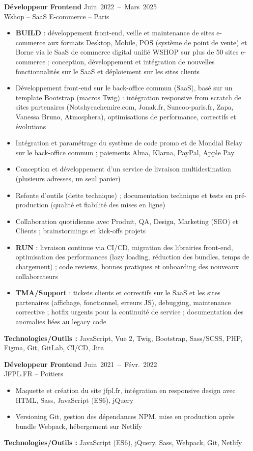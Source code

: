 \documentclass[9pt,a4paper]{extarticle}
\newcommand{\entry}[3]{%
  \vspace{0.25em}%
  {\bfseries #1} \hfill {\color{grey}\footnotesize\mbox{#2}}\\[-1pt]
  {\color{accent}\footnotesize #3}\par\vspace{0.1em}%
}
\begin{document}
{\begin{minipage}[t]{0.488\textwidth}
\entry{Développeur Frontend}{Juin 2022 -- Mars 2025}{Wshop -- SaaS E-commerce -- Paris}
\begin{itemize}
  \item \textbf{BUILD} : développement front-end, veille et maintenance de sites e-commerce aux formats Desktop, Mobile, POS (système de point de vente) et Borne via le SaaS de commerce digital unifié WSHOP sur plus de 50 sites e-commerce ; conception, développement et intégration de nouvelles fonctionnalités sur le SaaS et déploiement sur les sites clients
  \item Développement front-end sur le back-office commun (SaaS), basé sur un template Bootstrap (macros Twig) : intégration responsive from scratch de sites partenaires (Notshycachemire.com, Jonak.fr, Suncoo-paris.fr, Zapa, Vanessa Bruno, Atmosphera), optimisations de performance, correctifs et évolutions
  \item Intégration et paramétrage du système de code promo et de Mondial Relay sur le back-office commun ; paiements Alma, Klarna, PayPal, Apple Pay
  \item Conception et développement d'un service de livraison multidestination (plusieurs adresses, un seul panier)
  \item Refonte d'outils (dette technique) ; documentation technique et tests en pré-production (qualité et fiabilité des mises en ligne)
  \item Collaboration quotidienne avec Produit, QA, Design, Marketing (SEO) et Clients ; brainstormings et kick-offs projets
  \item \textbf{RUN} : livraison continue via CI/CD, migration des librairies front-end, optimisation des performances (lazy loading, réduction des bundles, temps de chargement) ; code reviews, bonnes pratiques et onboarding des nouveaux collaborateurs
  \item \textbf{TMA/Support} : tickets clients et correctifs sur le SaaS et les sites partenaires (affichage, fonctionnel, erreurs JS), debugging, maintenance corrective ; hotfix urgents pour la continuité de service ; documentation des anomalies liées au legacy code
\end{itemize}
{\footnotesize\textbf{Technologies/Outils :} JavaScript, Vue 2, Twig, Bootstrap, Sass/SCSS, PHP, Figma, Git, GitLab, CI/CD, Jira}

\entry{Développeur Frontend}{Juin 2021 -- Févr. 2022}{JFPL.FR -- Poitiers}
\begin{itemize}
  \item Maquette et création du site jfpl.fr, intégration en responsive design avec HTML, Sass, JavaScript (ES6), jQuery
  \item Versioning Git, gestion des dépendances NPM, mise en production après bundle Webpack, hébergement sur Netlify
\end{itemize}
{\footnotesize\textbf{Technologies/Outils :} JavaScript (ES6), jQuery, Sass, Webpack, Git, Netlify}


\end{minipage}}
\end{document}
